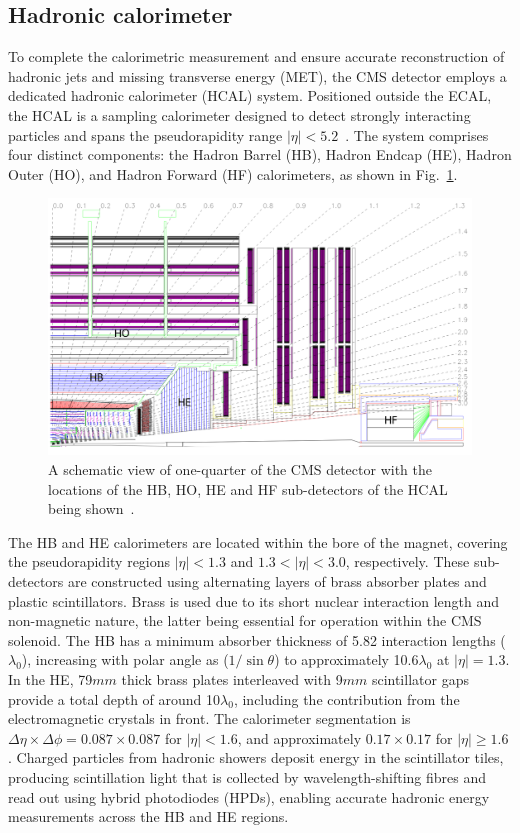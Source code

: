 \subsection{Hadronic calorimeter}
To complete the calorimetric measurement and ensure accurate reconstruction of hadronic jets and missing transverse energy (\ac{MET}), the CMS detector employs a dedicated hadronic calorimeter (HCAL) system. Positioned outside the ECAL, the HCAL is a sampling calorimeter designed to detect strongly interacting particles and spans the pseudorapidity range $|\eta| < 5.2$~\cite{LHC_CMS,CMS_Detector_Run3}. The system comprises four distinct components: the Hadron Barrel (HB), Hadron Endcap (HE), Hadron Outer (HO), and Hadron Forward (HF) calorimeters, as shown in Fig.~\ref{Figure:Chapter3_CMS_HCAL}.

\begin{figure}[h]
\centering
\includegraphics[width= 1.0\textwidth]{Figures/Chapter3/CMS_HCAL.pdf}
\caption{A schematic view of one-quarter of the CMS detector with the locations of the HB, HO, HE and HF sub-detectors of the HCAL being shown~\cite{LHC_CMS}.}
\label{Figure:Chapter3_CMS_HCAL}
\end{figure}

The HB and HE calorimeters are located within the bore of the magnet, covering the pseudorapidity regions $|\eta| < 1.3$ and $1.3 < |\eta| < 3.0$, respectively. These sub-detectors are constructed using alternating layers of brass absorber plates and plastic scintillators. Brass is used due to its short nuclear interaction length and non-magnetic nature, the latter being essential for operation within the CMS solenoid. The HB has a minimum absorber thickness of 5.82 interaction lengths ($\lambda_0$), increasing with polar angle as ($1/\sin\theta$) to approximately 10.6$\lambda_0$ at $|\eta| = 1.3$. In the HE, 79$\unit{mm}$ thick brass plates interleaved with 9$\unit{mm}$ scintillator gaps provide a total depth of around 10$\lambda_0$, including the contribution from the electromagnetic crystals in front. The calorimeter segmentation is $\Delta\eta \times \Delta\phi = 0.087 \times 0.087$ for $|\eta| < 1.6$, and approximately $0.17 \times 0.17$ for $|\eta| \geq 1.6$. Charged particles from hadronic showers deposit energy in the scintillator tiles, producing scintillation light that is collected by wavelength-shifting fibres and read out using hybrid photodiodes (HPDs), enabling accurate hadronic energy measurements across the HB and HE regions.

